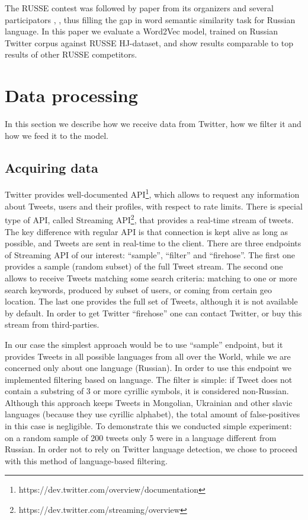 \documentclass{llncs}
\begin{document}
The RUSSE contest was followed by paper from its organizers \cite{Panchenko2015} and several participators \cite{Arefyev}, \cite{Kutuzov}, thus filling the gap in word semantic similarity task for Russian language. In this paper we evaluate a Word2Vec model, trained on Russian Twitter corpus against RUSSE HJ-dataset, and show results comparable to top results of other RUSSE competitors.
%
\section{Data processing}
%
In this section we describe how we receive data from Twitter, how we filter it and how we feed it to the model.
%
\subsection{Acquiring data}
%
Twitter provides well-documented API\footnote{https://dev.twitter.com/overview/documentation}, which allows to request any information about Tweets, users and their profiles, with respect to rate limits. There is special type of API, called Streaming API\footnote{https://dev.twitter.com/streaming/overview}, that provides a real-time stream of tweets. The key difference with regular API is that connection is kept alive as long as possible, and Tweets are sent in real-time to the client. There are three endpoints of Streaming API of our interest: “sample”, “filter” and “firehose”. The first one provides a sample (random subset) of the full Tweet stream. The second one allows to receive Tweets matching some search criteria: matching to one or more search keywords, produced by subset of users, or coming from certain geo location. The last one provides the full set of Tweets, although it is not available by default. In order to get Twitter “firehose” one can contact Twitter, or buy this stream from third-parties.

In our case the simplest approach would be to use “sample” endpoint, but it provides Tweets in all possible languages from all over the World, while we are concerned only about one language (Russian). In order to use this endpoint we implemented filtering based on language. The filter is simple: if Tweet does not contain a substring of 3 or more cyrillic symbols, it is considered non-Russian. Although this approach keeps Tweets in Mongolian, Ukrainian and other slavic languages (because they use cyrillic alphabet), the total amount of false-positives in this case is negligible. To demonstrate this we conducted simple experiment: on a random sample of 200 tweets only 5 were in a language different from Russian. In order not to rely on Twitter language detection, we chose to proceed with this method of language-based filtering.
\end{document}
